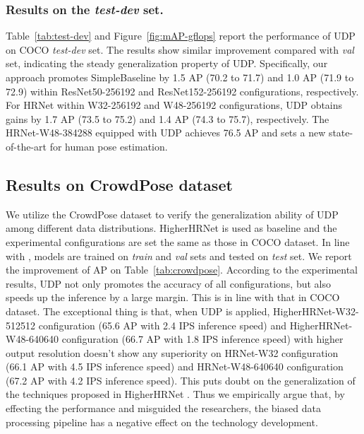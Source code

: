 \documentclass[10pt,journal,compsoc]{IEEEtran}
\begin{document}
\subsubsection{Results on the \textit{test-dev} set.} Table~\ref{tab:test-dev} and Figure~\ref{fig:mAP-gflops} report the performance of UDP on COCO \textit{test-dev} set. The results show similar improvement compared with \textit{val} set, indicating the steady generalization property of UDP. Specifically, our approach promotes SimpleBaseline by 1.5 AP (70.2 to 71.7) and 1.0 AP (71.9 to 72.9) within ResNet50-256192 and ResNet152-256192 configurations, respectively. For HRNet within W32-256192 and W48-256192 configurations, UDP obtains gains by 1.7 AP (73.5 to 75.2) and 1.4 AP (74.3 to 75.7), respectively. The HRNet-W48-384288 equipped with UDP achieves 76.5 AP and sets a new state-of-the-art for human pose estimation.

\subsection{Results on CrowdPose dataset}
We utilize the CrowdPose \cite{Crowdpose} dataset to verify the generalization ability of UDP among different data distributions. HigherHRNet \cite{Higher} is used as baseline and the experimental configurations are set the same as those in COCO dataset. In line with \cite{Higher}, models are trained on \textit{train} and \textit{val} sets and tested on \textit{test} set. We report the improvement of AP on Table~\ref{tab:crowdpose}. According to the experimental results, UDP not only promotes the accuracy of all configurations, but also speeds up the inference by a large margin. This is in line with that in COCO dataset. The exceptional thing is that, when UDP is applied, HigherHRNet-W32-512512 configuration (65.6 AP with 2.4 IPS inference speed) and HigherHRNet-W48-640640 configuration (66.7 AP with 1.8 IPS inference speed) with higher output resolution doesn't show any superiority on HRNet-W32 configuration (66.1 AP with 4.5 IPS inference speed) and HRNet-W48-640640 configuration (67.2 AP with 4.2 IPS inference speed). This puts doubt on the generalization of the techniques proposed in HigherHRNet \cite{Higher}. Thus we empirically argue that, by effecting the performance and misguided the researchers, the biased data processing pipeline has a negative effect on the technology development.
\end{document}
